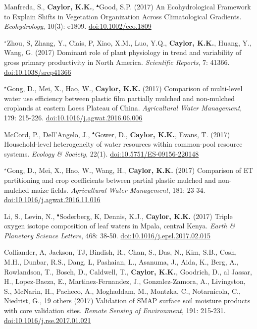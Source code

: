 \begin{etaremune}
\item Manfreda, S., \textbf{ Caylor, K.K.}, $^{\blacktriangle}$Good, S.P. (2017) An Ecohydrological Framework to Explain Shifts in Vegetation Organization Across Climatological Gradients. \emph{Ecohydrology}, 10(3): e1809. \href{https://doi.org/10.1002/eco.1809 }{doi:10.1002/eco.1809}
\item $^{\star}$Zhou, S, Zhang, Y., Ciais, P, Xiao, X.M., Luo, Y.Q., \textbf{ Caylor, K.K.}, Huang, Y., Wang, G. (2017) Dominant role of plant physiology in trend and variability of gross primary productivity in North America. \emph{Scientific Reports}, 7: 41366. \href{https://doi.org/10.1038/srep41366}{doi:10.1038/srep41366}
\item $^{\star}$Gong, D., Mei, X., Hao, W., \textbf{ Caylor, K.K.} (2017) Comparison of multi-level water use efficiency between plastic film partially mulched and non-mulched croplands at eastern Loess Plateau of China. \emph{Agricultural Water Management}, 179: 215-226. \href{https://doi.org/10.1016/j.agwat.2016.06.006}{doi:10.1016/j.agwat.2016.06.006}
\item McCord, P., Dell'Angelo, J., $^{\blacktriangle}$Gower, D., \textbf{ Caylor, K.K.}, Evans, T. (2017) Household-level heterogeneity of water resources within common-pool resource systems. \emph{Ecology \& Society}, 22(1). \href{https://doi.org/10.5751/ES-09156-220148}{doi:10.5751/ES-09156-220148}
\item $^{\star}$Gong, D., Mei, X., Hao, W., Wang, H., \textbf{ Caylor, K.K.} (2017) Comparison of ET partitioning and crop coefficients between partial plastic mulched and non-mulched maize fields. \emph{Agricultural Water Management}, 181: 23-34. \href{https://doi.org/10.1016/j.agwat.2016.11.016}{doi:10.1016/j.agwat.2016.11.016}
\item Li, S., Levin, N., $^{\blacklozenge}$Soderberg, K, Dennis, K.J., \textbf{ Caylor, K.K.} (2017) Triple oxygen isotope composition of leaf waters in Mpala, central Kenya. \emph{Earth \& Planetary Science Letters}, 468: 38-50. \href{https://doi.org/10.1016/j.epsl.2017.02.015}{doi:10.1016/j.epsl.2017.02.015}
\item Colliander, A, Jackson, TJ, Bindish, R., Chan, S., Das, N., Kim, S.B., Cosh, M.H., Dunbar, R.S., Dang, L, Pashaian, L., Asanuma, J., Aida, K., Berg, A., Rowlandson, T., Bosch, D., Caldwell, T., \textbf{ Caylor, K.K.}, Goodrich, D., al Jassar, H., Lopez-Baeza, E., Martinez-Fernandez, J., Gonzalez-Zamora, A., Livingston, S., McNarin, H., Pacheco, A., Moghaddam, M., Montzka, C., Notarnicola, C., Niedrist, G., 19 others (2017) Validation of SMAP surface soil moisture products with core validation sites. \emph{Remote Sensing of Environment}, 191: 215-231. \href{https://doi.org/10.1016/j.rse.2017.01.021}{doi:10.1016/j.rse.2017.01.021}

\end{etaremune}
